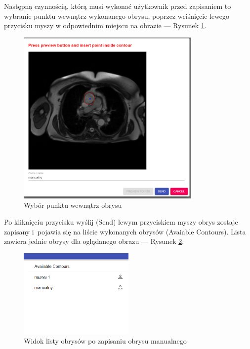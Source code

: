 \documentclass[a4paper,11pt,twoside,openright]{report}
\theoremstyle{definition}
\begin{document}
\begin{enumerate}
Następną czynnością, którą musi wykonać użytkownik przed zapisaniem to wybranie
punktu wewnątrz wykonanego obrysu, poprzez wciśnięcie lewego przycisku myszy w
odpowiednim miejscu na obrazie --- Rysunek \ref{fig:8}.


\pagebreak

\begin{figure}[h!]
	\center
	\includegraphics[width=0.8\textwidth]{8}
	\caption{Wybór punktu wewnątrz obrysu}
    	\label{fig:8}
\end{figure}

Po kliknięciu przycisku wyślij (Send) lewym przyciskiem myszy obrys zostaje
zapisany i~pojawia się na liście wykonanych obrysów (Avaiable Contours). Lista
zawiera jednie obrysy dla oglądanego obrazu --- Rysunek \ref{fig:9}.

\begin{figure}[h!]
	\center
	\includegraphics[width=0.5\textwidth]{9}
	\caption{Widok listy obrysów po zapisaniu obrysu manualnego}
    	\label{fig:9}
\end{figure}


\end{enumerate}
\end{document}

